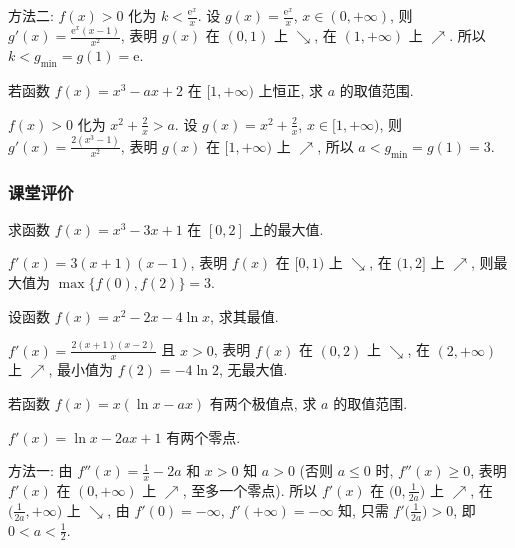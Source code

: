     方法二: $f(x)>0$ 化为 $k<\frac{\mathrm{e}^x}x$. 
    设 $g(x)=\frac{\mathrm{e}^x}x$, $x\in(0,+\infty)$, 则 $g'(x)=\frac{\mathrm{e}^x (x-1)}{x^2}$, 表明 $g(x)$ 在 $(0,1)$ 上 $\searrow$, 在 $(1,+\infty)$ 上 $\nearrow$. 所以 $k<g_{\min}=g(1)=\mathrm{e}$.
  \endsolution
  
  \begin{example}
    若函数 $f(x)=x^3-ax+2$ 在 $[1,+\infty)$ 上恒正, 求 $a$ 的取值范围.
  \end{example}

  \beginsolution
    $f(x)>0$ 化为 $x^2+\frac2x>a$. 
    设 $g(x)=x^2+\frac2x$, $x\in[1,+\infty)$, 则 $g'(x)=\frac{2(x^3-1)}{x^2}$, 表明 $g(x)$ 在 $[1,+\infty)$ 上 $\nearrow$, 所以 $a<g_{\min}=g(1)=3$.
  \endsolution
  
  \subsubsection{课堂评价}
  \begin{exercise}
    求函数 $f(x)=x^3 -3x+1$ 在 $[0,2]$ 上的最大值.
  \end{exercise}

  \beginsolution
    $f'(x)=3(x+1)(x-1)$, 表明 $f(x)$ 在 $[0,1)$ 上 $\searrow$, 在 $(1,2]$ 上 $\nearrow$, 则最大值为 $\max\{f(0),f(2)\}=3$.
  \endsolution
  
  \begin{exercise}
    设函数 $f(x)=x^2-2x-4\ln x$, 求其最值.
  \end{exercise}

  \beginsolution
    $f'(x)=\frac{2(x+1)(x-2)}x$ 且 $x>0$, 表明 $f(x)$ 在 $(0,2)$ 上 $\searrow$, 在 $(2,+\infty)$ 上 $\nearrow$, 最小值为 $f(2)=-4\ln 2$, 无最大值.
  \endsolution
  
  \begin{exercise}
    若函数 $f(x)=x(\ln x-ax)$ 有两个极值点, 求 $a$ 的取值范围.
  \end{exercise}

  \beginsolution
    $f'(x)=\ln x-2ax+1$ 有两个零点.
    
    方法一: 由  $f''(x)=\frac1x-2a$ 和 $x>0$ 知  $a>0$ (否则 $a\leqslant 0$ 时, $f''(x)\geqslant 0$, 表明 $f'(x)$ 在 $(0,+\infty)$ 上 $\nearrow$, 至多一个零点). 所以 $f'(x)$ 在 $\Big(0,\frac1{2a}\Big)$ 上 $\nearrow$, 在 $\Big(\frac1{2a},+\infty\Big)$ 上 $\searrow$, 
    由 $f'(0)=-\infty$, $f'(+\infty)=-\infty$ 知, 只需 $f'\Big(\frac1{2a}\Big)>0$, 即 $0<a<\frac12$.
    
